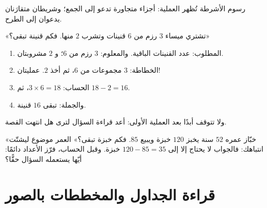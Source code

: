 \begin{omfigure}

{\small رسوم الأشرطة تُظهر العملية: أجزاء متجاورة تدعو إلى
الجمع؛ وشريطان متقارَنان يدعوان إلى الطرح.}
\end{omfigure}

\begin{example}\label{ex:g3:problems:twostep}
«تشتري ميساء $3$ رزم من $6$ قنينات وتشرب $2$ منها. فكم
قنينة تبقى؟»
\begin{enumerate}
  \item المطلوب: عدد القنينات الباقية. والمعلوم: $3$
        رزم من $6$؛ و $2$ مشروبتان.
  \item الخطاطة: $3$ مجموعات من $6$، ثم أخذ $2$. عمليتان!
  \item الحساب: $3 \times 6 = 18$، ثم $18 - 2 = 16$.
  \item والجملة: تبقى $16$ قنينة.
\end{enumerate}
ولا تتوقف أبدًا بعد العملية الأولى: أعد قراءة السؤال لترى هل
انتهت القصة.
\end{example}

\begin{example}\label{ex:g3:problems:trap}
«خبّاز عمره $52$ سنة يخبز $120$ خبزة ويبيع $85$.
فكم خبزة تبقى؟» العمر موضوع ليشتّت انتباهك: فالجواب لا يحتاج
إلا إلى $120 - 85 = 35$ خبزة. وقبل الحساب، فرّز الأعداد دائمًا:
أيّها يستعمله السؤال حقًّا؟
\end{example}

\section{قراءة الجداول والمخططات بالصور}

